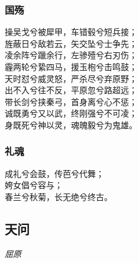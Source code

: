 \documentclass[]{article}
\begin{document}
\hypertarget{header-n2822}{%
\subsubsection{国殇}\label{header-n2822}}

操吴戈兮被犀甲，车错毂兮短兵接；\\
旌蔽日兮敌若云，矢交坠兮士争先；\\
凌余阵兮躐余行，左骖殪兮右刃伤；\\
霾两轮兮絷四马，援玉枹兮击鸣鼓；\\
天时怼兮威灵怒，严杀尽兮弃原野；\\
出不入兮往不反，平原忽兮路超远；\\
带长剑兮挟秦弓，首身离兮心不惩；\\
诚既勇兮又以武，终刚强兮不可凌；\\
身既死兮神以灵，魂魄毅兮为鬼雄。

\hypertarget{header-n2827}{%
\subsubsection{礼魂}\label{header-n2827}}

成礼兮会鼓，传芭兮代舞；\\
姱女倡兮容与；\\
春兰兮秋菊，长无绝兮终古。

\hypertarget{header-n2831}{%
\subsection{天问}\label{header-n2831}}

\emph{屈原}
\end{document}
